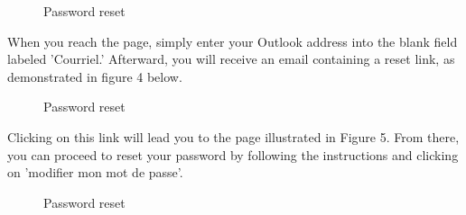 \documentclass[12pt]{article}
\begin{document}
\begin{figure}[H]
    \centering

    \caption{Password reset}
\end{figure}

When you reach the page, simply enter your Outlook address into the blank field labeled 'Courriel.' Afterward, you will receive an email containing a reset link, as demonstrated in figure 4 below. 
\begin{figure}[H]
    \centering

    \caption{Password reset}
\end{figure}


Clicking on this link will lead you to the page illustrated in Figure 5. From there, you can proceed to reset your password by following the instructions and clicking on 'modifier mon mot de passe'. 



\begin{figure}[H]
    \centering

    \caption{Password reset}
\end{figure}
\end{document}
